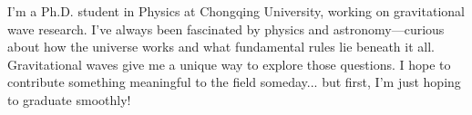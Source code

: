 
\begin{cvparagraph}
I'm a Ph.D. student in Physics at Chongqing University, working on gravitational wave research. I've always been fascinated by physics and astronomy—curious about how the universe works and what fundamental rules lie beneath it all. Gravitational waves give me a unique way to explore those questions. I hope to contribute something meaningful to the field someday... but first, I'm just hoping to graduate smoothly!
\end{cvparagraph}